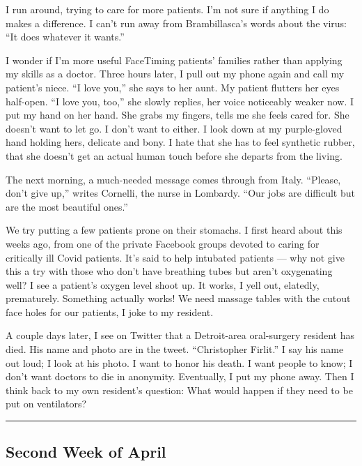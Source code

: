 I run around, trying to care for more patients. I'm not sure if anything
I do makes a difference. I can't run away from Brambillasca's words
about the virus: ``It does whatever it wants.''

I wonder if I'm more useful Face­Timing patients' families rather than
applying my skills as a doctor. Three hours later, I pull out my phone
again and call my patient's niece. ``I love you,'' she says to her aunt.
My patient flutters her eyes half-open. ``I love you, too,'' she slowly
replies, her voice noticeably weaker now. I put my hand on her hand. She
grabs my fingers, tells me she feels cared for. She doesn't want to let
go. I don't want to either. I look down at my purple-gloved hand holding
hers, delicate and bony. I hate that she has to feel synthetic rubber,
that she doesn't get an actual human touch before she departs from the
living.

The next morning, a much-needed message comes through from Italy.
``Please, don't give up,'' writes Cornelli, the nurse in Lombardy. ``Our
jobs are difficult but are the most beautiful ones.''

We try putting a few patients prone on their stomachs. I first heard
about this weeks ago, from one of the private Facebook groups devoted to
caring for critically ill Covid patients. It's said to help intubated
patients --- why not give this a try with those who don't have breathing
tubes but aren't oxygenating well? I see a patient's oxygen level shoot
up. It works, I yell out, elatedly, prematurely. Something actually
works! We need massage tables with the cutout face holes for our
patients, I joke to my resident.

A couple days later, I see on Twitter that a Detroit-area oral-surgery
resident has died. His name and photo are in the tweet. ``Christopher
Firlit.'' I say his name out loud; I look at his photo. I want to honor
his death. I want people to know; I don't want doctors to die in
anonymity. Eventually, I put my phone away. Then I think back to my own
resident's question: What would happen if they need to be put on
ventilators?

\begin{center}\rule{0.5\linewidth}{\linethickness}\end{center}

\hypertarget{second-week-of-april}{%
\subsection{Second Week of April}\label{second-week-of-april}}

